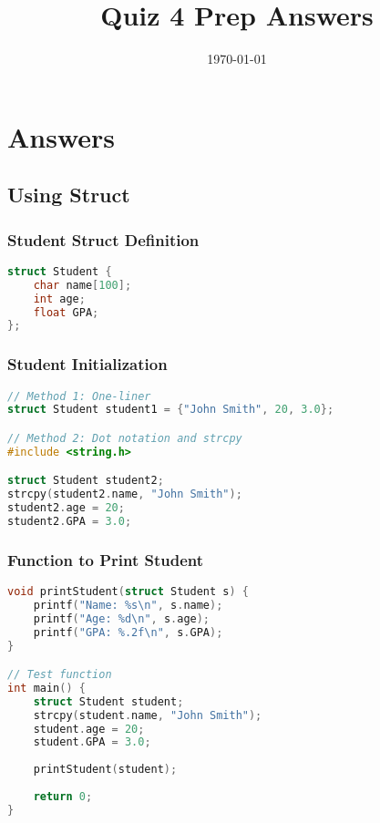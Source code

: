 \documentclass[12pt]{article}
\title{Quiz 4 Prep Answers}
\date{\today}
\begin{document}
\maketitle

\section{Answers}

\subsection{Using Struct}

\subsubsection{Student Struct Definition}
\begin{lstlisting}[language=C]
struct Student {
    char name[100];
    int age;
    float GPA;
};
\end{lstlisting}

\subsubsection{Student Initialization}
\begin{lstlisting}[language=C]
// Method 1: One-liner
struct Student student1 = {"John Smith", 20, 3.0};

// Method 2: Dot notation and strcpy
#include <string.h>

struct Student student2;
strcpy(student2.name, "John Smith");
student2.age = 20;
student2.GPA = 3.0;
\end{lstlisting}

\subsubsection{Function to Print Student}
\begin{lstlisting}[language=C]
void printStudent(struct Student s) {
    printf("Name: %s\n", s.name);
    printf("Age: %d\n", s.age);
    printf("GPA: %.2f\n", s.GPA);
}

// Test function
int main() {
    struct Student student;
    strcpy(student.name, "John Smith");
    student.age = 20;
    student.GPA = 3.0;
    
    printStudent(student);
    
    return 0;
}
\end{lstlisting}
\end{document}
